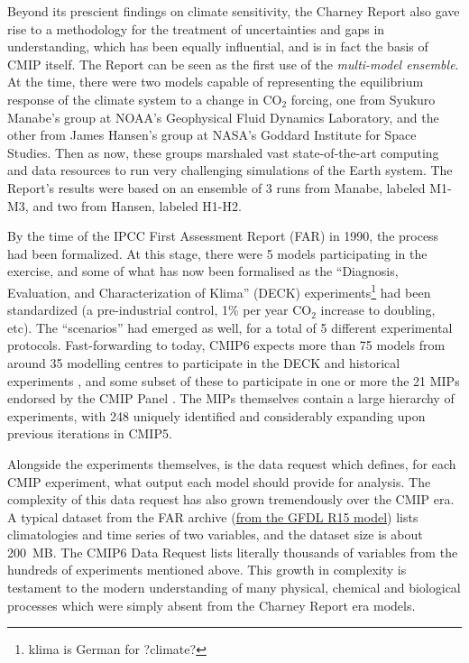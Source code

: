 \documentclass[gmd,manuscript]{copernicus}
\begin{document}
Beyond its prescient findings on climate sensitivity, the Charney
Report also gave rise to a methodology for the treatment of
uncertainties and gaps in understanding, which has been equally
influential, and is in fact the basis of CMIP itself. The Report can
be seen as the first use of the \emph{multi-model ensemble}. At the
time, there were two models capable of representing the equilibrium
response of the climate system to a change in CO$_2$ forcing, one from
Syukuro Manabe's group at NOAA's Geophysical Fluid Dynamics
Laboratory, and the other from James Hansen's group at NASA's Goddard
Institute for Space Studies. Then as now, these groups marshaled vast
state-of-the-art computing and data resources to run very challenging
simulations of the Earth system. The Report's results were based on an
ensemble of 3 runs from Manabe, labeled M1-M3, and two from Hansen,
labeled H1-H2.

By the time of the IPCC First Assessment Report (FAR) in 1990, the
process had been formalized. At this stage, there were 5 models
participating in the exercise, and some of what has now been
formalised as the ``Diagnosis, Evaluation, and Characterization of
Klima'' (DECK) experiments\footnote{klima is German for ?climate?} had
been standardized (a pre-industrial control, 1\% per year CO$_2$
increase to doubling, etc). The ``scenarios'' had emerged as well,
for a total of 5 different experimental protocols. Fast-forwarding to
today, CMIP6 expects more than 75 models from around 35 modelling 
centres \citep[in 14 countries, a stark contrast to the US monopoly
in][]{ref:charneyetal1979} to participate in the DECK and historical
experiments \citep[Table~2 of][]{ref:eyringetal2016a}, and some subset
of these to participate in one or more the 21 MIPs endorsed by the
CMIP Panel \citep[Table~3 of][]{ref:eyringetal2016a}. The MIPs
themselves contain a large hierarchy of experiments, with 248 
uniquely identified and considerably expanding upon previous 
iterations in CMIP5.

Alongside the experiments themselves, is the data request which
defines, for each CMIP experiment, what output each model should
provide for analysis. The complexity of this data request has also
grown tremendously over the CMIP era. A typical dataset from the FAR
archive (\href{https://goo.gl/M1WSJy}{from the GFDL R15 model}) lists
climatologies and time series of two variables, and the dataset size
is about 200~MB. The CMIP6 Data Request \citep[][replace with GMD
ref?]{ref:juckesetal2015} lists literally thousands of variables from
the hundreds of experiments mentioned above. This growth in complexity
is testament to the modern understanding of many physical, chemical
and biological processes which were simply absent from the Charney
Report era models.
\end{document}
